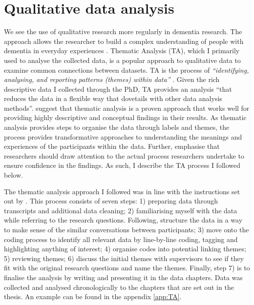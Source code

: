 \section{Qualitative data analysis}
\label{QualDataAnalysis}
We see the use of qualitative research more regularly in dementia research. The approach allows the researcher to build a complex understanding of people with dementia in everyday experiences \citep{mckeown_actively_2009}. Thematic Analysis (TA), which I primarily used to analyse the collected data, is a popular approach to qualitative data to examine common connections between datasets. TA is the process of \textit{``identifying, analysing, and reporting patterns (themes) within data''} \citep{braun_using_2006}. Given the rich descriptive data I collected through the PhD, TA provides an analysis ``that reduces the data in a flexible way that dovetails with other data analysis methods''. \citep{kiger2020thematic} suggest that thematic analysis is a proven approach that works well for providing highly descriptive and conceptual findings in their results. As thematic analysis provides steps to organise the data through labels and themes, the process provides transformative approaches to understanding the meanings and experiences of the participants within the data. Further, \cite{braun2012thematic} emphasise that researchers should draw attention to the actual process researchers undertake to ensure confidence in the findings. As such, I describe the TA process I followed below.

The thematic analysis approach I followed was in line with the instructions set out by \cite{braun_one_2020}. This process consists of seven steps: 1) preparing data through transcripts and additional data cleaning; 2) familiarising myself with the data while referring to the research questions. Following, structure the data in a way to make sense of the similar conversations between participants; 3) move onto the coding process to identify all relevant data by line-by-line coding, tagging and highlighting anything of interest; 4) organise codes into potential linking themes; 5) reviewing themes; 6) discuss the initial themes with supervisors to see if they fit with the original research questions and name the themes. Finally, step 7) is to finalise the analysis by writing and presenting it in the data chapters. Data was collected and analysed chronologically to the chapters that are set out in the thesis. An example can be found in the appendix \ref{app:TA}.


